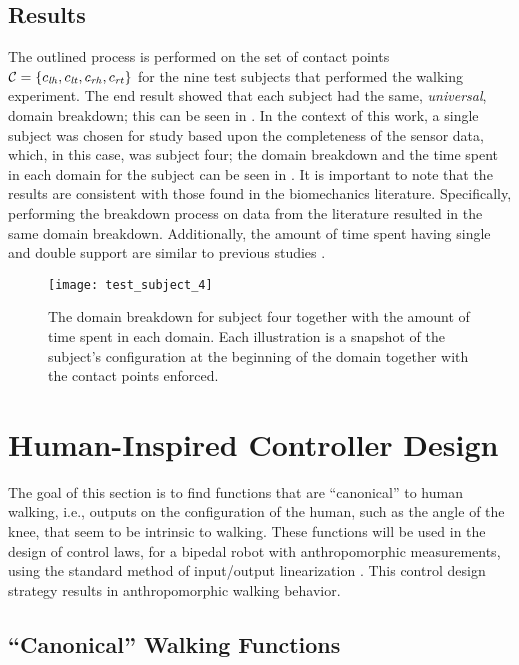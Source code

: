 \subsection{Results} The outlined process is performed on the set of contact
points $\mathcal{C} =  \{c_{\mathit{lh}}, c_{\mathit{lt}}, c_{\mathit{rh}} , c_{\mathit{rt}}\}$ for the nine test subjects that
performed the walking experiment. The end result showed that each subject had
the same, {\em universal}, domain breakdown; this can be seen in
. In the context of this work, a single subject was
chosen for study based upon the completeness of the sensor data, which, in this
case, was subject four; the domain breakdown and the time spent in each domain
for the subject can be seen in . It is important to note that the
results are consistent with those found in the biomechanics
literature. Specifically, performing the breakdown process on data from the
literature \cite{Winter2009} resulted in the same domain breakdown. Additionally,
the amount of time spent having single and double support are similar to
previous studies \cite{Ackermann2007}.

\begin{figure}[t]
  \centering
  \texttt{[image: test\_subject\_4]}
  \caption[The domain breakdown for subject four]{The domain breakdown for
    subject four together with the amount of time spent in each domain. Each
    illustration is a snapshot of the subject's configuration at the beginning
    of the domain together with the contact points enforced.}
  \label{fred}
\end{figure}

\section{Human-Inspired Controller Design}

The goal of this section is to find functions that are ``canonical'' to human
walking, i.e., outputs on the configuration of the human, such as the angle of
the knee, that seem to be intrinsic to walking.
%
These functions will be used in the design of control laws, for a bipedal robot
with anthropomorphic measurements, using the standard method of input/output
linearization \cite{Sastry1999}.
%
This control design strategy results in anthropomorphic walking behavior.

\subsection{``Canonical'' Walking Functions} \label{sec:functions}

